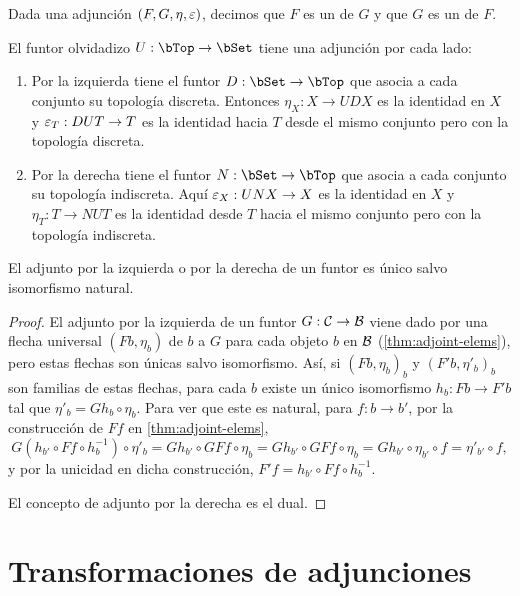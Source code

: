 \begin{definition}
  Dada una adjunción $(F,G,\eta,\varepsilon)$, decimos que $F$ es un  de $G$ y que $G$ es un  de $F$.
\end{definition}

\begin{example}
  El funtor olvidadizo $U:\bTop\to\bSet$ tiene una adjunción por cada
  lado:\cite[4.1]{riehl}
  \begin{enumerate}
  \item Por la izquierda tiene el funtor $D:\bSet\to\bTop$ que asocia a cada
    conjunto su topología discreta. Entonces $\eta_X:X\to UDX$ es la identidad
    en $X$ y $\varepsilon_T:DUT\to T$ es la identidad hacia $T$ desde el mismo conjunto
    pero con la topología discreta.
  \item Por la derecha tiene el funtor $N:\bSet\to\bTop$ que asocia a cada
    conjunto su topología indiscreta. Aquí $\varepsilon_X:UNX\to X$ es la identidad en
    $X$ y $\eta_T:T\to NUT$ es la identidad desde $T$ hacia el mismo conjunto
    pero con la topología indiscreta.
  \end{enumerate}
\end{example}

\begin{proposition}
  El adjunto por la izquierda o por la derecha de un funtor es único salvo
  isomorfismo natural.
\end{proposition}
\begin{proof}
  El adjunto por la izquierda de un funtor $G:\mathcal{C}\to\mathcal{B}$ viene dado por una
  flecha universal $(Fb,\eta_b)$ de $b$ a $G$ para cada objeto $b$ en $\mathcal{B}$
  (\ref{thm:adjoint-elems}), pero estas flechas son únicas salvo
  isomorfismo. Así, si $(Fb,\eta_b)_b$ y $(F'b,\eta'_b)_b$ son familias de estas
  flechas, para cada $b$ existe un único isomorfismo $h_b:Fb\to F'b$ tal que
  $\eta'_b=Gh_b\circ\eta_b$. Para ver que este es natural, para $f:b\to b'$, por
  la construcción de $Ff$ en \ref{thm:adjoint-elems},
  \[
    G(h_{b'}\circ Ff\circ h_b^{-1})\circ\eta'_b = Gh_{b'}\circ GFf\circ\eta_b
    = Gh_{b'}\circ GFf\circ\eta_b = Gh_{b'}\circ\eta_{b'}\circ f = \eta'_{b'}\circ f,
  \]
  y por la unicidad en dicha construcción, $F'f=h_{b'}\circ Ff\circ h_b^{-1}$.

  El concepto de adjunto por la derecha es el dual.
\end{proof}

\section{Transformaciones de adjunciones}

